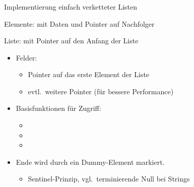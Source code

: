 \begin{frame}
\frametitle{\insertsection}
\begin{block}
{Implementierung einfach verketteter Listen}
\end{block}
\vspace{-1em}
\begin{block}
{Elemente:  mit Daten und Pointer auf Nachfolger}
\end{block}
\vspace{-1em}
\begin{block}
{Liste:  mit Pointer auf den Anfang der Liste}
\begin{itemize}
	\item Felder:
	\begin{itemize}
		\item Pointer auf das erste Element der Liste
		\item evtl.\ weitere Pointer (für bessere Performance)
	\end{itemize}
	\item<2-> Basisfunktionen für Zugriff:
	\begin{itemize}
		\item {}
		\item {}
		\item {}
	\end{itemize}
	\item<3-> Ende wird durch ein Dummy-Element markiert.
	\begin{itemize}
	    \item Sentinel-Prinzip, vgl.\ terminierende Null bei Strings
	\end{itemize}
\end{itemize}
\end{block}
\end{frame}